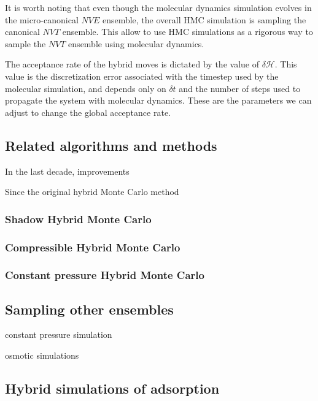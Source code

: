 \documentclass[thesis]{subfiles}
\begin{document}
It is worth noting that even though the molecular dynamics simulation evolves in
the micro-canonical $NVE$ ensemble, the overall HMC simulation is sampling the
canonical $NVT$ ensemble. This allow to use HMC simulations as a rigorous way to
sample the $NVT$ ensemble using molecular dynamics.

The acceptance rate of the hybrid moves is dictated by the value of
$\delta\mathcal{H}$. This value is the discretization error associated with the
timestep used by the molecular simulation, and depends only on $\delta t$ and
the number of steps used to propagate the system with molecular dynamics. These
are the parameters we can adjust to change the global acceptance rate.

\subsection{Related algorithms and methods}

In the last decade, improvements

Since the original hybrid Monte Carlo method

\subsubsection{Shadow Hybrid Monte Carlo}

\subsubsection{Compressible Hybrid Monte Carlo}

\subsubsection{Constant pressure Hybrid Monte Carlo}


\TODO\cite{Akhmatskaya2009}

\TODO\cite{Izaguirre2004}

\TODO\cite{Akhmatskaya2011}

\TODO\cite{Fang2014}

\subsection{Sampling other ensembles}

\TODO constant pressure simulation

\TODO osmotic simulations\cite{Rogge2019}

\subsection{Hybrid simulations of adsorption}
\end{document}
